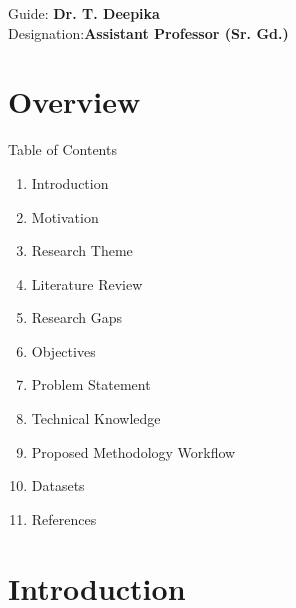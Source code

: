 \documentclass[aspectratio=169, 11pt]{beamer}
\begin{document}
\begin{frame}
\begin{minipage}{0.7\textwidth}
        \vfill
        \footnotesize
        Guide: \textbf{Dr. T. Deepika}\\
        {\scriptsize Designation:\textbf{Assistant Professor (Sr. Gd.)}\\}

 \end{minipage}
 \end{frame} 


\section{Overview}
\begin{frame}{Table of Contents}

\begin{enumerate}
    \item Introduction
    \item Motivation
    \item Research Theme
    \item Literature Review
    \item Research Gaps
    \item Objectives
    \item Problem Statement
    \item Technical Knowledge
    \item Proposed Methodology Workflow
    \item Datasets
    \item References
\end{enumerate}

\end{frame}


\section{Introduction}
\end{document}
